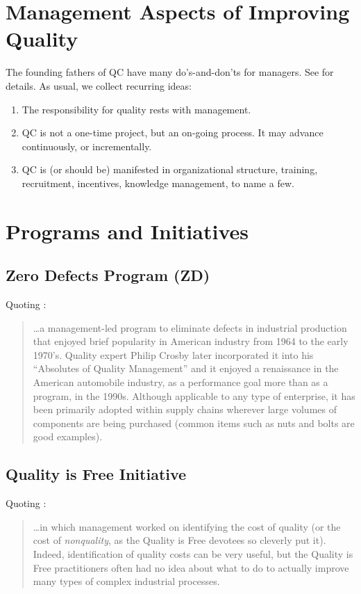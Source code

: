\section{Management Aspects of Improving Quality}

The founding fathers of QC have many do's-and-don'ts for managers.
See \citet[Sec 1.4]{montgomery_introduction_2007} for details. 
As usual, we collect recurring ideas:
\begin{tcolorbox}
\begin{enumerate}
\item The responsibility for quality rests with management. 
\item QC is not a one-time project, but an on-going process. It may advance continuously, or incrementally.
\item QC is (or should be) manifested in organizational structure, training, recruitment, incentives, knowledge management, to name a few.
\end{enumerate}
\end{tcolorbox}



\section{Programs and Initiatives}


\subsection{Zero Defects Program (ZD)}
Quoting \cite{wikipedia_zero_2015}:
\begin{quote}
\dots a management-led program to eliminate defects in industrial production that enjoyed brief popularity in American industry from 1964 to the early 1970's. Quality expert Philip Crosby later incorporated it into his ``Absolutes of Quality Management'' and it enjoyed a renaissance in the American automobile industry, as a performance goal more than as a program, in the 1990s. Although applicable to any type of enterprise, it has been primarily adopted within supply chains wherever large volumes of components are being purchased (common items such as nuts and bolts are good examples).
\end{quote}


\subsection{Quality is Free Initiative}
Quoting \cite{montgomery_introduction_2007}:
\begin{quote}
\dots in which management worked on identifying the cost of quality (or the cost of \emph{nonquality}, as the Quality is Free devotees so cleverly put it). Indeed, identification of quality costs can be very useful, but the Quality is Free practitioners often had no idea about what to do to actually improve many types of complex industrial processes.
\end{quote}


